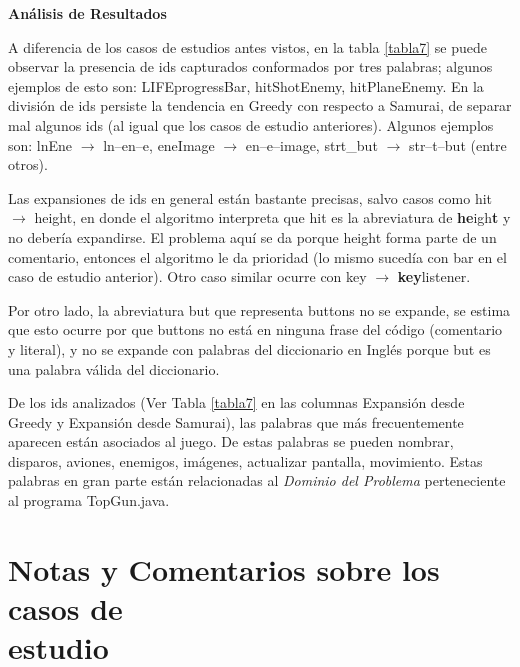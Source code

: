 \noindent \textbf{Análisis de Resultados\\}

A diferencia de los casos de estudios antes vistos, en la tabla \ref{tabla7} se puede observar la presencia de ids capturados conformados por tres palabras; algunos ejemplos de esto son: \textsf{LIFEprogressBar}, \textsf{hitShotEnemy}, \textsf{hitPlaneEnemy}.
En la división de ids persiste la tendencia en Greedy con respecto a Samurai, de separar mal algunos ids (al igual que los casos de estudio anteriores). Algunos ejemplos son: \textsf{lnEne} $\rightarrow$ \textsf{ln--en--e}, \textsf{eneImage}  $\rightarrow$ \textsf{en--e--image}, \textsf{strt\_but} $\rightarrow$ \textsf{str--t--but} (entre otros).

Las expansiones de ids en general están bastante precisas, salvo casos como \textsf{hit} $\rightarrow$ \textsf{height}, en donde el algoritmo interpreta que \textsf{hit} es la abreviatura de \textsf{\textbf{he}igh\textbf{t}} y no debería expandirse. El problema aquí se da porque \textsf{height} forma parte de un comentario, entonces el algoritmo le da prioridad (lo mismo sucedía con \textsf{bar} en el caso de estudio anterior). Otro caso similar ocurre con \textsf{key} $\rightarrow$ \textsf{\textbf{key}listener}.

Por otro lado, la abreviatura \textsf{but} que representa \textsf{buttons} no se expande, se estima que esto ocurre por que \textsf{buttons} no está en ninguna frase del código (comentario y literal), y no se expande con palabras del diccionario en Inglés porque \textsf{but} es una palabra válida del diccionario.

De los ids analizados (Ver Tabla \ref{tabla7} en las columnas Expansión desde Greedy y Expansión desde Samurai), las palabras que más frecuentemente aparecen están asociados al juego. De estas palabras se pueden nombrar, disparos, aviones, enemigos, imágenes, actualizar pantalla, movimiento. Estas palabras en gran parte están relacionadas al \textit{Dominio del Problema} perteneciente al programa TopGun.java.

\section{Notas y Comentarios sobre los casos de\\ estudio}

